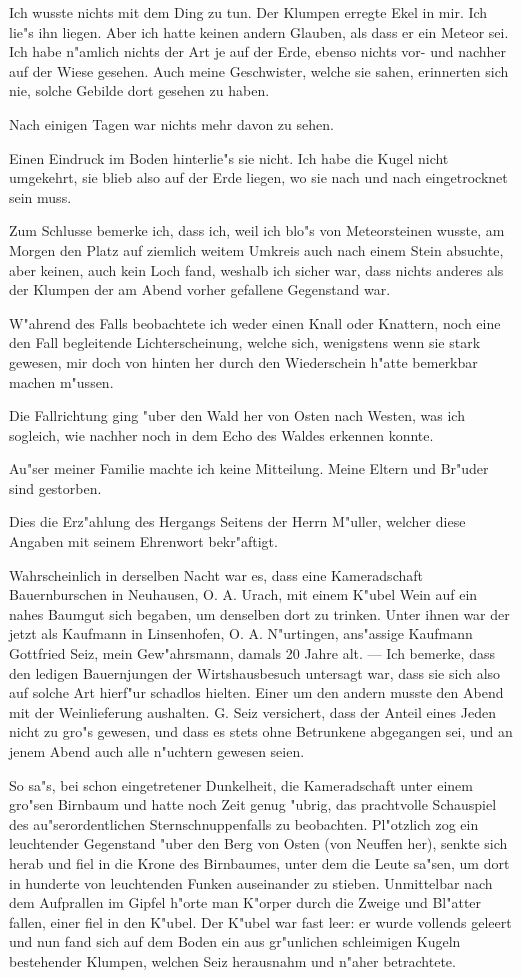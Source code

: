 \documentclass[a4paper, 11pt, oneside, german]{article}
\begin{document}
Ich wusste nichts mit dem Ding zu tun. Der Klumpen erregte Ekel in mir. Ich lie"s ihn liegen. Aber ich hatte keinen andern Glauben, als dass er ein Meteor sei. Ich habe n"amlich nichts der Art je auf der Erde, ebenso nichts vor- und nachher auf der Wiese gesehen. Auch meine Geschwister, welche sie sahen, erinnerten sich nie, solche Gebilde dort gesehen zu haben.

Nach einigen Tagen war nichts mehr davon zu sehen.

Einen Eindruck im Boden hinterlie"s sie nicht. Ich habe die Kugel nicht umgekehrt, sie blieb also auf der Erde liegen, wo sie nach und nach eingetrocknet sein muss.

Zum Schlusse bemerke ich, dass ich, weil ich blo"s von Meteorsteinen wusste, am Morgen den Platz auf ziemlich weitem Umkreis auch nach einem Stein absuchte, aber keinen, auch kein Loch fand, weshalb ich sicher war, dass nichts anderes als der Klumpen der am Abend vorher gefallene Gegenstand war.

W"ahrend des Falls beobachtete ich weder einen Knall oder Knattern, noch eine den Fall begleitende Lichterscheinung, welche sich, wenigstens wenn sie stark gewesen, mir doch von hinten her durch den Wiederschein h"atte bemerkbar machen m"ussen.

Die Fallrichtung ging "uber den Wald her von Osten nach Westen, was ich sogleich, wie nachher noch in dem Echo des Waldes erkennen konnte.

Au"ser meiner Familie machte ich keine Mitteilung. Meine Eltern und Br"uder sind gestorben.

Dies die Erz"ahlung des Hergangs Seitens der Herrn M"uller, welcher diese Angaben mit seinem Ehrenwort bekr"aftigt.

Wahrscheinlich in derselben Nacht war es, dass eine Kameradschaft Bauernburschen in Neuhausen, O. A. Urach, mit einem K"ubel Wein auf ein nahes Baumgut sich begaben, um denselben dort zu trinken. Unter ihnen war der jetzt als Kaufmann in Linsenhofen, O. A. N"urtingen, ans"assige Kaufmann Gottfried Seiz, mein Gew"ahrsmann, damals 20 Jahre alt. — Ich bemerke, dass den ledigen Bauernjungen der Wirtshausbesuch untersagt war, dass sie sich also auf solche Art hierf"ur schadlos hielten. Einer um den andern musste den Abend mit der Weinlieferung aushalten. G. Seiz versichert, dass der Anteil eines Jeden nicht zu gro"s gewesen, und dass es stets ohne Betrunkene abgegangen sei, und an jenem Abend auch alle n"uchtern gewesen seien.

So sa"s, bei schon eingetretener Dunkelheit, die Kameradschaft unter einem gro"sen Birnbaum und hatte noch Zeit genug "ubrig, das prachtvolle Schauspiel des au"serordentlichen Sternschnuppenfalls zu beobachten. Pl"otzlich zog ein leuchtender Gegenstand "uber den Berg von Osten (von Neuffen her), senkte sich herab und fiel in die Krone des Birnbaumes, unter dem die Leute sa"sen, um dort in hunderte von leuchtenden Funken auseinander zu stieben. Unmittelbar nach dem Aufprallen im Gipfel h"orte man K"orper durch die Zweige und Bl"atter fallen, einer fiel in den K"ubel. Der K"ubel war fast leer: er wurde vollends geleert und nun fand sich auf dem Boden ein aus gr"unlichen schleimigen Kugeln bestehender Klumpen, welchen Seiz herausnahm und n"aher betrachtete.
\end{document}
